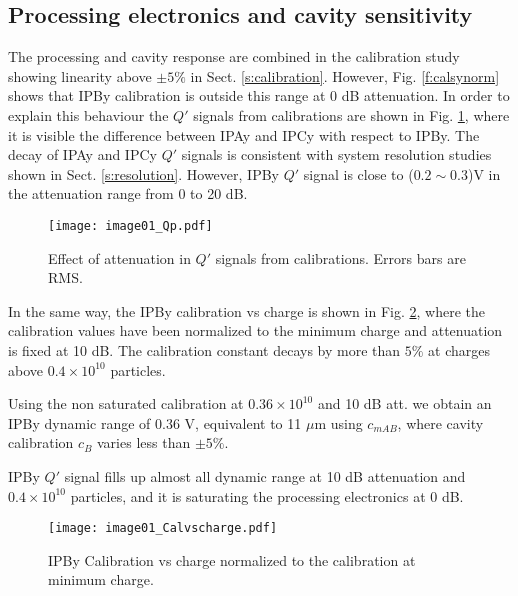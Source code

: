 \subsection{Processing electronics and cavity sensitivity}
The processing and cavity response are combined in the calibration study showing linearity above $\pm5\%$ in Sect. \ref{s:calibration}. However, Fig. \ref{f:calsynorm} shows that IPBy calibration is outside this range at 0 dB attenuation. In order to explain this behaviour the $Q'$ signals from calibrations are shown in Fig. \ref{f:Qp}, where it is visible the difference between IPAy and IPCy with respect to IPBy. The decay of IPAy and IPCy $Q'$ signals is consistent with system resolution studies shown in Sect. \ref{s:resolution}. However, IPBy $Q'$ signal is close to ($0.2\sim0.3$)V in the attenuation range from 0 to 20 dB.\par%
\begin{figure}[!htb]
\centering
 \texttt{[image: image01\_Qp.pdf]}\caption{Effect of attenuation in $Q'$ signals from calibrations. Errors bars are RMS.}\label{f:Qp}
\end{figure}
In the same way, the IPBy calibration vs charge is shown in Fig. \ref{f:chargescan}, where the calibration values have been normalized to the minimum charge and attenuation is fixed at 10 dB. The calibration constant decays by more than $5\%$ at charges above $0.4\times10^{10}$ particles.\par
Using the non saturated calibration at $0.36\times10^{10}$ and 10 dB att. we obtain an IPBy dynamic range of 0.36 V, equivalent to 11 $\mu$m using $c_{mAB}$, where cavity calibration $c_B$ varies less than $ \pm5\%$.\par
IPBy $Q'$ signal fills up almost all dynamic range at 10 dB attenuation and $0.4\times10^{10}$ particles, and it is saturating the processing electronics at 0 dB.\par
\begin{figure}[!htb]
\centering%
 \texttt{[image: image01\_Calvscharge.pdf]}\caption{IPBy Calibration vs charge normalized to the calibration at minimum charge.}\label{f:chargescan}
\end{figure}
